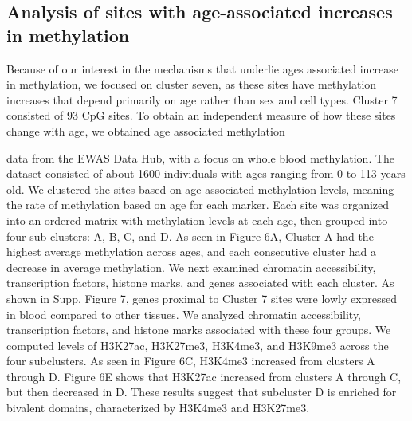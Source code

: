 \documentclass[sn-nature]{sn-jnl}
\begin{document}
{\begin{linenumbers}
\subsection{Analysis of sites with age-associated increases in methylation}
Because of our interest in the mechanisms that underlie ages associated increase in methylation, we focused on cluster seven,  
as these sites have methylation increases that depend primarily on age rather than sex and cell types. Cluster 7 consisted 
of 93 CpG sites. To obtain an independent measure of how these sites change with age, we obtained age associated methylation 

data from the EWAS Data Hub\cite{Xiong2020-fa}, with a focus on whole blood methylation. The dataset consisted of  
about 1600 individuals with ages ranging from 0 to 113 years old\cite{McCartney2019-qi}. We  clustered the sites 
based on age associated methylation levels, meaning the rate of methylation based on age for each marker. Each site 
was organized into an ordered matrix with methylation levels at each age, then grouped into four sub-clusters: A, B, C, and D.
 As seen in Figure 6A, Cluster A had the highest average methylation across ages, and each consecutive cluster had a 
 decrease in average methylation. We next examined chromatin accessibility, transcription factors, histone marks, and 
 genes associated with each cluster.  As shown in Supp. Figure 7, genes proximal to Cluster 7 sites were lowly expressed 
 in blood compared to other tissues.  We analyzed chromatin accessibility, transcription factors, and histone marks 
 associated with these four groups. We computed levels of H3K27ac, H3K27me3, H3K4me3, and H3K9me3 across the four 
 subclusters. As seen in Figure 6C, H3K4me3 increased from clusters A through D. Figure 6E shows that H3K27ac
  increased from clusters A through C, but then decreased in D. These results suggest that subcluster D is 
  enriched for bivalent domains, characterized by H3K4me3 and H3K27me3.


\end{linenumbers}}
\end{document}
